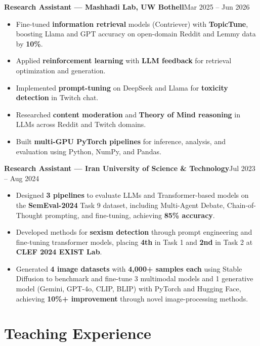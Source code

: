 \documentclass[letterpaper,10pt]{article}
\newcommand{\entry}[2]{%
  \noindent\textbf{#1}\hfill{\small\color{mygray}#2}%
}
\begin{document}
\vspace{3pt}
\entry{Research Assistant --- Mashhadi Lab, UW Bothell}{Mar 2025 -- Jun 2026}
\begin{itemize}
  \item Fine-tuned \textbf{information retrieval} models (Contriever) with \textbf{TopicTune}, boosting Llama and GPT accuracy on open-domain Reddit and Lemmy data by \textbf{10\%}.
  \item Applied \textbf{reinforcement learning} with \textbf{LLM feedback} for retrieval optimization and generation.
  \item Implemented \textbf{prompt-tuning} on DeepSeek and Llama for \textbf{toxicity detection} in Twitch chat.
  \item Researched \textbf{content moderation} and \textbf{Theory of Mind reasoning} in LLMs across Reddit and Twitch domains.
  \item Built \textbf{multi-GPU PyTorch pipelines} for inference, analysis, and evaluation using Python, NumPy, and Pandas.
\end{itemize}

\vspace{3pt}
\entry{Research Assistant --- Iran University of Science \& Technology}{Jul 2023 -- Aug 2024}
\begin{itemize}
  \item Designed \textbf{3 pipelines} to evaluate LLMs and Transformer-based models on the \textbf{SemEval-2024} Task 9 dataset, including Multi-Agent Debate, Chain-of-Thought prompting, and fine-tuning, achieving \textbf{85\% accuracy}.
  \item Developed methods for \textbf{sexism detection} through prompt engineering and fine-tuning transformer models, placing \textbf{4th} in Task 1 and \textbf{2nd} in Task 2 at \textbf{CLEF 2024 EXIST Lab}.
  \item Generated \textbf{4 image datasets} with \textbf{4,000+ samples each} using Stable Diffusion to benchmark and fine-tune 3 multimodal models and 1 generative model (Gemini, GPT-4o, CLIP, BLIP) with PyTorch and Hugging Face, achieving \textbf{10\%+ improvement} through novel image-processing methods.
\end{itemize}

\section{Teaching Experience}
\end{document}
